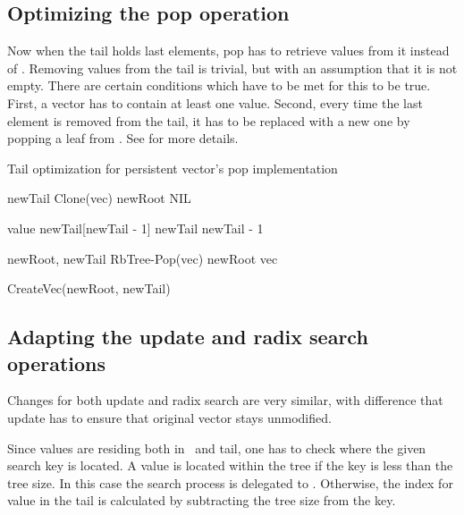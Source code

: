 \subsection*{Optimizing the pop operation}

Now when the tail holds last elements, pop has to retrieve values from it instead of \rbtree. Removing values from the tail is trivial, but with an assumption that it is not empty. There are certain conditions which have to be met for this to be true. First, a vector has to contain at least one value. Second, every time the last element is removed from the tail, it has to be replaced with a new one by popping a leaf from \rbtree. See  for more details. 

\begin{listing}[ht!]
    \caption{Tail optimization for persistent vector’s pop implementation}
    \label{lst:pvec-pop}
    
    \begin{algorithmic}
        
        \State newTail \la Clone(vec)
        \State newRoot \la NIL

        \State value \la newTail[newTail - 1]
        \State newTail \la newTail - 1     
            
            \State newRoot, newTail \la RbTree-Pop(vec)            
        \Else 
            \State newRoot \la vec
        \EndIf
        
        \State \Return CreateVec(newRoot, newTail)
        \EndFunction
    \end{algorithmic}
\end{listing}

\subsection*{Adapting the update and radix search operations}
Changes for both update and radix search are very similar, with difference that update has to ensure that original vector stays unmodified. 

Since values are residing both in \rbtree\ and tail, one has to check where the given search key is located. A value is located within the tree if the key is less than the tree size. In this case the search process is delegated to \rbtree. Otherwise, the index for value in the tail is calculated by subtracting the tree size from the key. 

